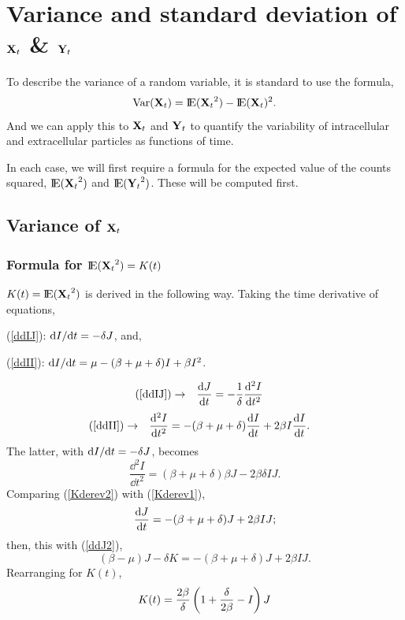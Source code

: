 \section{Variance and standard deviation of ${{\bf X}_t}$ \& ${{\bf Y}_t}$}

To describe the variance of a random variable, it is standard to use the formula, 
\begin{equation*}
\text{Var}({{\bf X}_t}) = {\rm I}\!{\rm E}({{\bf X}_t}^2) - {\rm I}\!{\rm E}({{\bf X}_t})^2.
\end{equation*}
And we can apply this to ${{\bf X}_t}$ and ${{\bf Y}_t}$ to quantify the variability of intracellular and extracellular particles as functions of time. 

In each case, we will first require a formula for the expected value of the counts squared,  ${\rm I}\!{\rm E}({{\bf X}_t}^2)$ and ${\rm I}\!{\rm E}({{\bf Y}_t}^2)$.
These will be computed first.



\subsection{Variance of ${{\bf X}_t}$}

\subsubsection{Formula for ${\rm I}\!{\rm E}({{\bf X}_t}^2) = K(t)$}

$K(t) = {\rm I}\!{\rm E}({{\bf X}_t}^2)$ is derived in the following way. Taking the time derivative of equations,

 (\ref{ddIJ}): ${\rm d}I/{\rm d}t = -\delta J$, and, 
 
 (\ref{ddII}): ${\rm d}I/{\rm d}t = \mu - (\beta + \mu + \delta) I + \beta I^2$.

\begin{align}
\label{Kderev1}
\text{(\ref{ddIJ})}\to&&\displaystyle\frac{{\rm d} J}{{\rm d} t} = -\frac{1}{\delta}\frac{{\rm d}^2 I}{{\rm d} t^2}&&
\end{align}
\begin{align*}
\text{(\ref{ddII})}\to&& \frac{{\rm d}^2 I}{{\rm d} t^2} = -(\beta + \mu + \delta) \displaystyle\frac{{\rm d} I}{{\rm d} t} + 2\beta I \displaystyle\frac{{\rm d} I}{{\rm d} t}.&&
\end{align*}
The latter, with ${\rm d}I/{\rm d}t = -\delta J$, becomes
\begin{equation}
\label{Kderev2}
\frac{\dd^2 I}{\dd t^2} = (\beta + \mu + \delta)\beta J- 2\beta \delta I J.
\end{equation}
Comparing (\ref{Kderev2}) with (\ref{Kderev1}),
\begin{equation*}
\displaystyle\frac{{\rm d} J}{{\rm d} t} = -(\beta + \mu + \delta) J + 2\beta I J;
\end{equation*}
then, this with (\ref{ddJ2}),
$$(\beta - \mu) J - \delta K = -(\beta + \mu + \delta) J + 2\beta I J.$$
Rearranging for $K(t)$,
\begin{equation*}
K(t) = \frac{2\beta}{\delta}\left(1+\frac{\delta}{2\beta} - I\right) J
\end{equation*}



